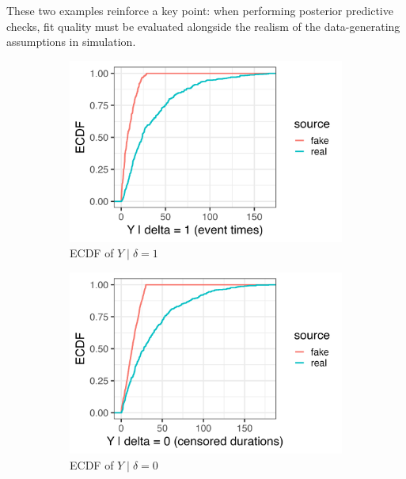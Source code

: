 These two examples reinforce a key point: when performing posterior predictive checks, fit quality must be evaluated alongside the realism of the data-generating assumptions in simulation.
\begin{figure}[htbp]
\centering
\begin{subfigure}[t]{0.32\textwidth}
  \centering
  \includegraphics[width=\linewidth]{images/ppc_event_ecdf_A30.png}  %
  \caption{ECDF of $Y \mid \delta=1$}
  \label{fig:ecdf-event_a30}
\end{subfigure}\hfill
\begin{subfigure}[t]{0.32\textwidth}
  \centering
  \includegraphics[width=\linewidth]{images/ppc_censored_ecdf_A30.png}   
  \caption{ECDF of $Y \mid \delta=0$}
  \label{fig:ecdf-cens_a30}
\end{subfigure}\hfill
\begin{subfigure}[t]{0.35\textwidth}

\end{subfigure}
\end{figure}
